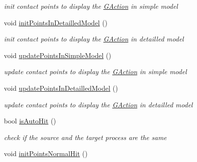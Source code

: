 \begin{DoxyCompactItemize}
\begin{DoxyCompactList}\small\item\em init contact points to display the \hyperlink{classGAction}{G\+Action} in simple model \end{DoxyCompactList}\item 
\hypertarget{classGAction_a374e74c397d09f202c05e506413a885d}{void \hyperlink{classGAction_a374e74c397d09f202c05e506413a885d}{init\+Points\+In\+Detailled\+Model} ()}\label{classGAction_a374e74c397d09f202c05e506413a885d}

\begin{DoxyCompactList}\small\item\em init contact points to display the \hyperlink{classGAction}{G\+Action} in detailled model \end{DoxyCompactList}\item 
\hypertarget{classGAction_afd02cc0b1d7efcaf012dd9045c22f659}{void \hyperlink{classGAction_afd02cc0b1d7efcaf012dd9045c22f659}{update\+Points\+In\+Simple\+Model} ()}\label{classGAction_afd02cc0b1d7efcaf012dd9045c22f659}

\begin{DoxyCompactList}\small\item\em update contact points to display the \hyperlink{classGAction}{G\+Action} in simple model \end{DoxyCompactList}\item 
\hypertarget{classGAction_af512e122e9c332aa70e804cab303efca}{void \hyperlink{classGAction_af512e122e9c332aa70e804cab303efca}{update\+Points\+In\+Detailled\+Model} ()}\label{classGAction_af512e122e9c332aa70e804cab303efca}

\begin{DoxyCompactList}\small\item\em update contact points to display the \hyperlink{classGAction}{G\+Action} in detailled model \end{DoxyCompactList}\item 
\hypertarget{classGAction_aa03acf91fcd0c6b8eaa4fb5e610e83e5}{bool \hyperlink{classGAction_aa03acf91fcd0c6b8eaa4fb5e610e83e5}{is\+Auto\+Hit} ()}\label{classGAction_aa03acf91fcd0c6b8eaa4fb5e610e83e5}

\begin{DoxyCompactList}\small\item\em check if the source and the target process are the same \end{DoxyCompactList}\item 
\hypertarget{classGAction_a5eb7f465ca07cb553c8d628aae1b125b}{void \hyperlink{classGAction_a5eb7f465ca07cb553c8d628aae1b125b}{init\+Points\+Normal\+Hit} ()}\label{classGAction_a5eb7f465ca07cb553c8d628aae1b125b}


\end{DoxyCompactItemize}
